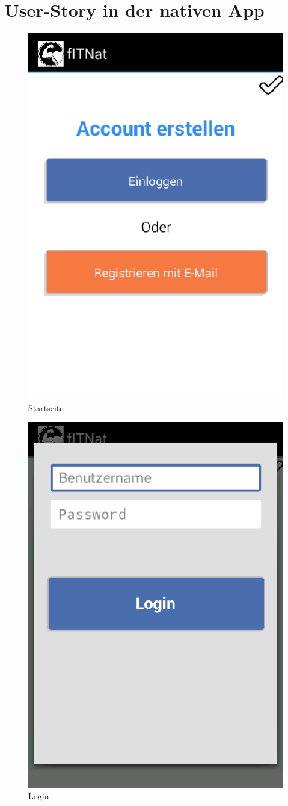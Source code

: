 \section{User-Story in der nativen App}
\label{sec:UserStory}
\begin{figure}[!h]
\centering
\includegraphics[width=0.5\linewidth]{content/images/App/Startseite}
\caption{Startseite}
\label{pic:natAppStartseite}
\end{figure}
\begin{figure}[!h]
\centering
\includegraphics[width=0.5\linewidth]{content/images/App/SignIn}
\caption{Login}
\label{pic:natAppLogin}
\end{figure}
